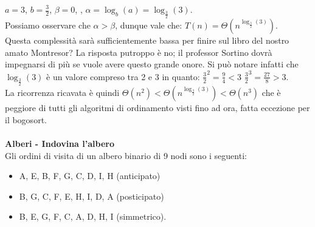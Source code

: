 \documentclass[../cheatSheetAlgoritmi.tex]{subfiles}
\begin{document}
$a = 3$, $b = \frac{3}{2}$, $\beta = 0$, , $\alpha = \log_b(a) = \log_\frac{3}{2}(3)$. \\
Possiamo osservare che $\alpha > \beta$, dunque vale che: $T(n) = \Theta(n^{\log_{\frac{3}{2}}(3)})$. \\ Questa complessità sarà sufficientemente bassa per finire sul libro del nostro amato Montresor? La risposta putroppo è no; il professor Sortino dovrà impegnarsi di più se vuole avere questo grande onore. Si può notare infatti che $\log_{\frac{3}{2}}(3)$ è un valore compreso tra 2 e 3 in quanto: $\frac{3}{2}^2 = \frac{9}{4} < 3$ $\frac{3}{2}^3 = \frac{27}{8} >3 $. \\ La ricorrenza ricavata è quindi $\Theta(n^2) < \Theta(n^{\log_{\frac{3}{2}}(3)}) < \Theta(n^3)$ che è peggiore di tutti gli algoritmi di ordinamento visti fino ad ora, fatta eccezione per il bogosort.\\\\
\newpage
\textbf{Alberi - Indovina l'albero}\\
Gli ordini di visita di un albero binario di 9 nodi sono i seguenti:

\begin{itemize}
	\item A, E, B, F, G, C, D, I, H (anticipato)
	\item B, G, C, F, E, H, I, D, A (posticipato)
	\item B, E, G, F, C, A, D, H, I (simmetrico).
\end{itemize}
\end{document}
